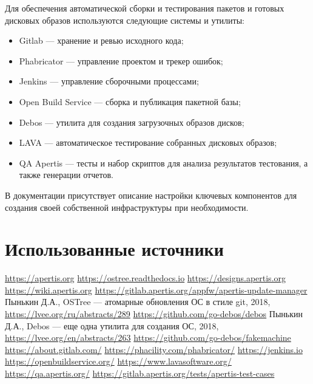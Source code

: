 \documentclass[10pt, a5paper]{article}
\begin{document}
Для обеспечения автоматической сборки и тестирования пакетов и готовых дисковых образов используются следующие системы и утилиты:

\begin{itemize}
  \item Gitlab\cite{bib10} --- хранение и ревью исходного кода;
  \item Phabricator\cite{bib11} --- управление проектом и трекер ошибок;
  \item Jenkins\cite{bib12} --- управление сборочными процессами;
  \item Open Build Service\cite{bib13} --- сборка и публикация пакетной базы;
  \item Debos\cite{bib7} --- утилита для создания загрузочных образов дисков;
  \item LAVA\cite{bib14} --- автоматическое тестирование собранных дисковых образов;
  \item QA Apertis\cite{bib15} --- тесты и набор скриптов для анализа результатов тестования, а также генерации отчетов.
\end{itemize}

В документации\cite{bib3} присутствует описание настройки ключевых компонентов для создания своей собственной инфраструктуры при необходимости.

\section*{Использованные источники}

\begin{thebibliography}{9}
 \url{https://apertis.org}
 \url{https://ostree.readthedocs.io}
 \url{https://designs.apertis.org}
 \url{https://wiki.apertis.org}
 \url{https://gitlab.apertis.org/appfw/apertis-update-manager}
 Пынькин Д.А., OSTree --- атомарные обновления ОС в стиле git, 2018, \url{https://lvee.org/ru/abstracts/289}
 \url{https://github.com/go-debos/debos}
 Пынькин Д.А., Debos --- еще одна утилита для создания ОС, 2018, \url{https://lvee.org/en/abstracts/263}
 \url{https://github.com/go-debos/fakemachine}
 \url{https://about.gitlab.com/}
 \url{https://phacility.com/phabricator/}
 \url{https://jenkins.io}
 \url{https://openbuildservice.org/}
 \url{https://www.lavasoftware.org/}
 \url{https://qa.apertis.org/}
 \url{https://gitlab.apertis.org/tests/apertis-test-cases}
\end{thebibliography}
\end{document}
